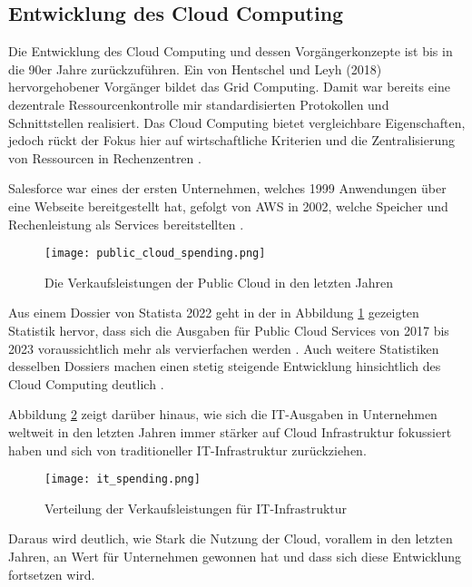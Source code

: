 \subsection{Entwicklung des Cloud Computing}
\label{sec:entwicklung}
Die Entwicklung des Cloud Computing und dessen Vorgängerkonzepte ist bis in die 90er Jahre zurückzuführen. Ein von Hentschel und Leyh (2018) hervorgehobener Vorgänger bildet das Grid Computing. Damit war bereits eine dezentrale Ressourcenkontrolle mir standardisierten Protokollen und Schnittstellen realisiert. Das Cloud Computing bietet vergleichbare Eigenschaften, jedoch rückt der Fokus hier auf wirtschaftliche Kriterien und die Zentralisierung von Ressourcen in Rechenzentren \cite[Vgl.][S. 5f]{Reinheimer2018}.

Salesforce war eines der ersten Unternehmen, welches 1999 Anwendungen über eine Webseite bereitgestellt hat, gefolgt von \ac{AWS} in 2002, welche Speicher und Rechenleistung als Services bereitstellten \cite[Vgl.][S. 17f]{Srivastava2018}.

\begin{figure}[H]
    \texttt{[image: public\_cloud\_spending.png]}
    \caption{Die Verkaufsleistungen der Public Cloud in den letzten Jahren \cite[S. 8]{Statista2022}}
    \label{fig:public_cloud_spending}
\end{figure}

Aus einem Dossier von Statista 2022 geht in der in Abbildung \ref{fig:public_cloud_spending} gezeigten Statistik hervor, dass sich die Ausgaben für Public Cloud Services von 2017 bis 2023 voraussichtlich mehr als vervierfachen werden \cite[Vgl.][S. 8]{Statista2022}. Auch weitere Statistiken desselben Dossiers machen einen stetig steigende Entwicklung hinsichtlich des Cloud Computing deutlich \cite[Vgl. unter anderem][S. 11ff]{Statista2022}. \pagebreak

Abbildung \ref{fig:it-spending} zeigt darüber hinaus, wie sich die IT-Ausgaben in Unternehmen weltweit in den letzten Jahren immer stärker auf Cloud Infrastruktur fokussiert haben und sich von traditioneller IT-Infrastruktur zurückziehen.

\begin{figure}[H]
    \texttt{[image: it\_spending.png]}
    \caption{Verteilung der Verkaufsleistungen für IT-Infrastruktur \cite[S. 7]{Statista2022}}
    \label{fig:it-spending}
\end{figure}

Daraus wird deutlich, wie Stark die Nutzung der Cloud, vorallem in den letzten Jahren, an Wert für Unternehmen gewonnen hat und dass sich diese Entwicklung fortsetzen wird.

